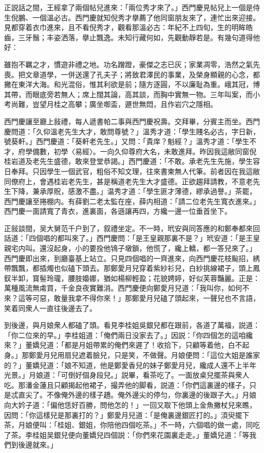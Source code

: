 正説話之間，王經拿了兩個帖兒進來：「兩位秀才來了。」西門慶見帖兒上一個是侍生倪鵬、一個溫必古。西門慶就知倪秀才擧薦了他同窗朋友來了，連忙出來迎接。見都穿着衣巾進來，且不看倪秀才，觀看那溫必古：年紀不上四旬，生的明眸皓齒，三牙鬚；丰姿洒落，擧止飄逸。未知行藏何如，先觀動靜若是。有幾句道得他好：

雖抱不羈之才，慣遊非禮之地。功名蹭蹬，豪傑之志已灰；家業凋零，浩然之氣先喪。把文章道學，一併送還了孔夫子；將致君澤民的事業，及榮身顯親的心念，都撇在東洋大海。和光混俗，惟其利欲是前；隨方逐圓，不以廉耻為重。峨其冠，博其帶，而眼底旁若無人；席上闊其論，高其談，而胸中實無一物。三年叫案，而小考尚難，豈望月桂之高攀；廣坐啣盃，遯世無悶，且作岩穴之隱相。

西門慶讓至廳上敍禮，每人遞書帕二事與西門慶祝壽。交拜畢，分賓主而坐。西門慶問道：「久仰溫老先生大才，敢問尊號？」溫秀才道：「學生賤名必古，字日新，號葵軒。」西門慶道：「葵軒老先生。」又問：「貴庠？魁經？」溫秀才道：「學生不才，府學備數，初學〈易經〉。一向久仰尊府大名，未敢進拜。昨因我這敝同窗倪桂岩道及老先生盛德，敢來登堂恭謁。」西門慶道：「不敢。承老先生先施，學生容日奉拜。只因學生一個武官，粗俗不知文理，往來書柬無人代筆。前者因在我這敝同僚府上，會遇桂岩老先生，甚是稱道老先生大才盛德。正欲趨拜請教，不意老先生下降，兼承厚貺，感激不盡。」温秀才道：「學生匪才薄德，繆承過譽。」茶罷，西門慶讓至捲棚内。有薛劉二老太監在座，薛内相道：「請二位老先生寬衣進來。」西門慶一面請寬了青衣，進裏面，各遜讓再四，方纔一邊一位垂首坐下。

正敍談間，吴大舅范千户到了，叙禮坐定。不一時，玳安與同答應的和鄭奉都來回話道：「四個唱的都叫來了。」西門慶問：「是王皇親那裏不是？」玳安道：「是王皇親宅内叫。還沒起身，小的要拴他鴇子墩鎖，他慌了，纔上轎，都一答兒來了。」西門慶即出來，到廳臺基上站立。只見四個唱的一齊進來，向西門慶花枝颭招，綉帶飄飄，都插燭也似磕下頭去。那鄭愛月兒穿着紫紗衫兒，白紗挑線裙子，頭上鳳釵半卸，寳髻玲瓏，腰肢嬝娜，猶如楊柳輕盈；花貌娉婷，好似芙蓉豔麗。正是：萬種風流無䖏買，千金良夜實難消。西門慶便向鄭愛月兒道：「我叫你，如何不來？這等可惡，敢量我拿不得你來！」那鄭愛月兒磕了頭起來，一聲兒也不言語，笑着同衆人一直往後邊去了。

到後邊，與月娘衆人都磕了頭。看見李桂姐吳銀兒都在跟前，各道了萬福，説道：「你二位來的早。」李桂姐道：「俺們兩日没家去了。」因説：「你四個怎的這咱纔來？」董嬌兒道：「都是月姐帶累的俺們來遲了！收拾下，只顧等着他，白不起身。」那鄭愛月兒用扇兒遮着臉兒，只是笑，不做聲。月娘便問：「這位大姐是誰家的？」董嬌兒道：「娘不知道，他是鄭愛香兒的妹子鄭愛月兒，纔成人還不上半年光景。」月娘道：「可倒好個身段兒。」説畢，看茶吃了。一面放桌兒擺茶與衆人吃。那潘金蓮且只顧揭起他裙子，撮弄他的脚看，説道：「你們這裏邊的樣子，只是忒直尖了。不像俺外邊的樣子趫。俺外邊尖的停匀，你裏邊的後跟子大。」月娘向大妗子道：「偏他恁好百勝，問他怎的！」一回又取下他頭上金魚撇杖兒來瞧，因問：「你這樣兒是那裏打的？」鄭愛月兒道：「是俺裏邊銀匠打的。」湏臾擺下茶，月娘便叫：「桂姐、銀姐，你陪他四個吃茶。」不一時，六個唱的做一處，同吃了茶。李桂姐吴銀兒便向董嬌兒四個説：「你們來花園裏走走。」董嬌兒道：「等我們到後邊就來。」

